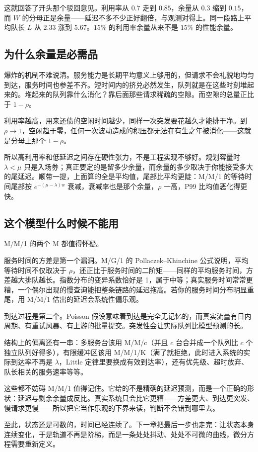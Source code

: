 这就回答了开头那个驳回意见。利用率从 \(0.7\) 走到 \(0.85\)，余量从 \(0.3\) 缩到 \(0.15\)，而 \(W\) 的分母正是余量——延迟不多不少正好翻倍，与观测对得上。同一段路上平均队长 \(L\) 从 \(2.33\) 涨到 \(5.67\)。\(15\%\) 的利用率余量从来不是 \(15\%\) 的性能余量。

\subsection{为什么余量是必需品}

爆炸的机制不难说清。服务能力是长期平均意义上够用的，但请求不会礼貌地均匀到达，服务时间也参差不齐。短时间内的挤兑必然发生，队列就是在这些时刻堆起来的。堆起来的队列靠什么消化？靠后面那些请求稀疏的空隙。而空隙的总量正比于 \(1-\rho\)。

利用率越高，用来还债的空闲时间越少，同样一次突发要花越久才能排干净。到 \(\rho\to 1\)，空闲趋于零，任何一次波动造成的积压都无法在有生之年被消化——这就是分母上那个 \(1-\rho\)。

所以高利用率和低延迟之间存在硬性张力，不是工程实现不够好。规划容量时 \(\lambda<\mu\) 只是入场券；真正要定的是留多少余量，而余量的多少取决于你能接受多大的尾延迟。顺带一提，上面算的全是平均值，尾部比平均更陡：M/M/1 的等待时间尾部按 \(e^{-(\mu-\lambda)w}\) 衰减，衰减率也是那个余量，\(\rho\) 一高，P99 比均值恶化得更快。

\subsection{这个模型什么时候不能用}

M/M/1 的两个 M 都值得怀疑。

服务时间的方差是第一个漏洞。M/G/1 的 Pollaczek--Khinchine 公式说明，平均等待时间不仅取决于 \(\rho\)，还正比于服务时间的二阶矩——同样的平均服务时间，方差越大排队越长。指数分布的变异系数恰好是 1，属于中等；真实服务时间常常更糟，一个偶尔出现的慢查询能把整条链路的延迟拖高。若你的服务时间分布明显重尾，用 M/M/1 估出的延迟会系统性偏乐观。

到达过程是第二个。Poisson 假设意味着到达是完全无记忆的，而真实流量有日内周期、有重试风暴、有上游的批量提交。突发性会让实际队列比模型预测的长。

结构上的偏离还有一串：多服务台该用 M/M/c（并且 \(c\) 台合并成一个队列比 \(c\) 个独立队列好得多），有限缓冲区该用 M/M/1/K（满了就拒绝，此时进入系统的实际到达率不再是 \(\lambda\)，Little 定律里要换成有效到达率），还有优先级、超时放弃、队长相关的服务速率等等。

这些都不妨碍 M/M/1 值得记住。它给的不是精确的延迟预测，而是一个正确的形状：延迟与剩余余量成反比。真实系统只会比它更糟——方差更大、到达更突发、慢请求更慢——所以把它当作乐观的下界来读，判断不会错到哪里去。

至此，状态还是可数的，时间已经连续了。下一章把最后一步也走完：让状态本身连续变化，于是轨道不再是阶梯，而是一条处处抖动、处处不可微的曲线，微分方程需要重新定义。
